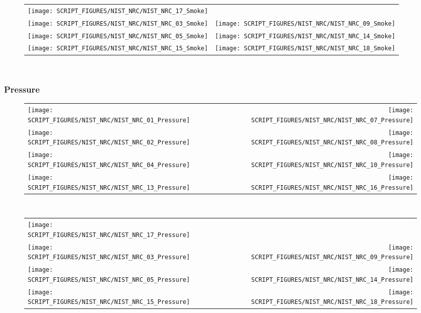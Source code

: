 \begin{figure}[!ht]
\begin{tabular*}{\textwidth}{l@{\extracolsep{\fill}}r}
\texttt{[image: SCRIPT\_FIGURES/NIST\_NRC/NIST\_NRC\_17\_Smoke]} & \\
\texttt{[image: SCRIPT\_FIGURES/NIST\_NRC/NIST\_NRC\_03\_Smoke]} &
\texttt{[image: SCRIPT\_FIGURES/NIST\_NRC/NIST\_NRC\_09\_Smoke]} \\
\texttt{[image: SCRIPT\_FIGURES/NIST\_NRC/NIST\_NRC\_05\_Smoke]} &
\texttt{[image: SCRIPT\_FIGURES/NIST\_NRC/NIST\_NRC\_14\_Smoke]} \\
\texttt{[image: SCRIPT\_FIGURES/NIST\_NRC/NIST\_NRC\_15\_Smoke]} &
\texttt{[image: SCRIPT\_FIGURES/NIST\_NRC/NIST\_NRC\_18\_Smoke]}
\end{tabular*}\
\label{NIST_NRC_Smoke_Open}
\end{figure}

\clearpage

\subsubsection{Pressure}

\begin{figure}[!ht]
\begin{tabular*}{\textwidth}{l@{\extracolsep{\fill}}r}
\texttt{[image: SCRIPT\_FIGURES/NIST\_NRC/NIST\_NRC\_01\_Pressure]} &
\texttt{[image: SCRIPT\_FIGURES/NIST\_NRC/NIST\_NRC\_07\_Pressure]} \\
\texttt{[image: SCRIPT\_FIGURES/NIST\_NRC/NIST\_NRC\_02\_Pressure]} &
\texttt{[image: SCRIPT\_FIGURES/NIST\_NRC/NIST\_NRC\_08\_Pressure]} \\
\texttt{[image: SCRIPT\_FIGURES/NIST\_NRC/NIST\_NRC\_04\_Pressure]} &
\texttt{[image: SCRIPT\_FIGURES/NIST\_NRC/NIST\_NRC\_10\_Pressure]} \\
\texttt{[image: SCRIPT\_FIGURES/NIST\_NRC/NIST\_NRC\_13\_Pressure]} &
\texttt{[image: SCRIPT\_FIGURES/NIST\_NRC/NIST\_NRC\_16\_Pressure]}
\end{tabular*}\
\label{NIST_NRC_Pressure_Closed}
\end{figure}

\begin{figure}[!ht]
\begin{tabular*}{\textwidth}{l@{\extracolsep{\fill}}r}
\texttt{[image: SCRIPT\_FIGURES/NIST\_NRC/NIST\_NRC\_17\_Pressure]} &
   \\
\texttt{[image: SCRIPT\_FIGURES/NIST\_NRC/NIST\_NRC\_03\_Pressure]} &
\texttt{[image: SCRIPT\_FIGURES/NIST\_NRC/NIST\_NRC\_09\_Pressure]} \\
\texttt{[image: SCRIPT\_FIGURES/NIST\_NRC/NIST\_NRC\_05\_Pressure]} &
\texttt{[image: SCRIPT\_FIGURES/NIST\_NRC/NIST\_NRC\_14\_Pressure]} \\
\texttt{[image: SCRIPT\_FIGURES/NIST\_NRC/NIST\_NRC\_15\_Pressure]} &
\texttt{[image: SCRIPT\_FIGURES/NIST\_NRC/NIST\_NRC\_18\_Pressure]}
\end{tabular*}
\label{NIST_NRC_Pressure_Open}
\end{figure}

